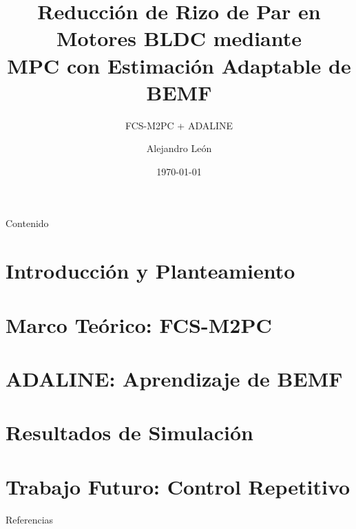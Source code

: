 \documentclass[aspectratio=169,xcolor=dvipsnames]{beamer}
\title{Reducción de Rizo de Par en Motores BLDC mediante\\MPC con Estimación Adaptable de BEMF}
\subtitle{FCS-M2PC + ADALINE}
\author{Alejandro León}
\institute
{
    Instituto de Ingeniería \\
    Universidad Nacional Autónoma de México
}
\date{\today}
\begin{document}
\begin{frame}
    \titlepage
\end{frame}

\begin{frame}{Contenido}
    \tableofcontents
\end{frame}

\section{Introducción y Planteamiento}


\section{Marco Teórico: FCS-M2PC}


\section{ADALINE: Aprendizaje de BEMF}


\section{Resultados de Simulación}


\section{Trabajo Futuro: Control Repetitivo}


\begin{frame}{Referencias}
    \footnotesize
    
    
\end{frame}
\end{document}

